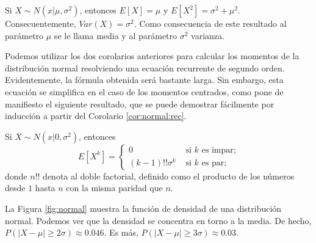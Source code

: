 \documentclass{article}
\begin{document}
\begin{cor}
    Si $X \sim N(x|\mu,\sigma^2)$, entonces $E[X] = \mu$ y $E[X^2] = \sigma^2 + \mu^2$. Consecuentemente, $Var(X) = \sigma^2$. Como consecuencia de este resultado al parámetro $\mu$ se le llama media y al parámetro $\sigma^2$ varianza.
\end{cor}

Podemos utilizar los dos corolarios anteriores para calcular los momentos de la distribución normal resolviendo una ecuación recurrente de segundo orden. Evidentemente, la fórmula obtenida será bastante larga. Sin embargo, esta ecuación se simplifica en el caso de los momentos centrados, como pone de manifiesto el siguiente resultado, que se puede demostrar fácilmente por inducción a partir del Corolario \ref{cor:normal:rec}.

\begin{cor}
    Si $X \sim N(x|0,\sigma^2)$, entonces
    \[E[X^k] = \begin{cases} 0 & \text{ si } k \text{ es impar;} \\ (k-1)!! \sigma^{k} & \text{ si } k \text{ es par;} \end{cases}\]
    donde $n!!$ denota al doble factorial, definido como el producto de los números desde $1$ hasta $n$ con la misma paridad que $n$.
\end{cor}

La Figura \ref{fig:normal} muestra la función de densidad de una distribución normal. Podemos ver que la densidad se concentra en torno a la media. De hecho, $P(|X - \mu| \ge 2\sigma) \approx 0.046$. Es más, $P(|X - \mu| \ge 3\sigma) \approx 0.03$.
\end{document}
